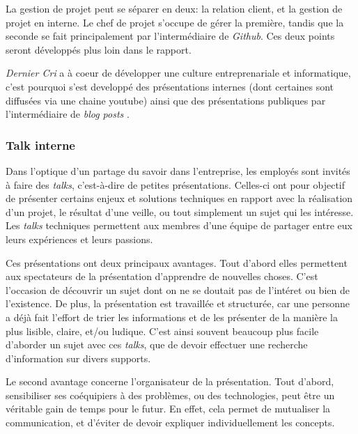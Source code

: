 \documentclass[12pt,a4paper]{article}
\begin{document}
  \bigskip

  La gestion de projet peut se séparer en deux: la relation client, et la
  gestion de projet en interne. Le chef de projet s'occupe de gérer la
  première, tandis que la seconde se fait principalement par
  l'intermédiaire de \emph{Github}. Ces deux points seront développés plus
  loin dans le rapport.

  \bigskip

  \emph{Dernier Cri} a à coeur de développer une culture entreprenariale
  et informatique, c'est pourquoi s'est developpé des présentations
  internes (dont certaines sont diffusées via une chaine youtube) ainsi
  que des présentations publiques par l'intermédiaire de \emph{blog posts}
  .

  \subsubsection{Talk interne}\label{talk-interne}

  \bigskip

  Dans l'optique d'un partage du savoir dans l'entreprise, les employés
  sont invités à faire des \emph{talks}, c'est-à-dire de petites
  présentations. Celles-ci ont pour objectif de présenter certains enjeux
  et solutions techniques en rapport avec la réalisation d'un projet, le
  résultat d'une veille, ou tout simplement un sujet qui les intéresse.
  Les \emph{talks} techniques permettent aux membres d'une équipe de
  partager entre eux leurs expériences et leurs passions.

  \bigskip

  Ces présentations ont deux principaux avantages. Tout d'abord elles
  permettent aux spectateurs de la présentation d'apprendre de nouvelles
  choses. C'est l'occasion de découvrir un sujet dont on ne se doutait pas
  de l'intéret ou bien de l'existence. De plus, la présentation est
  travaillée et structurée, car une personne a déjà fait l'effort de trier
  les informations et de les présenter de la manière la plus lisible,
  claire, et/ou ludique. C'est ainsi souvent beaucoup plus facile
  d'aborder un sujet avec ces \emph{talks}, que de devoir effectuer une
  recherche d'information sur divers supports.

  \bigskip

  Le second avantage concerne l'organisateur de la présentation. Tout
  d'abord, sensibiliser ses coéquipiers à des problèmes, ou des
  technologies, peut être un véritable gain de temps pour le futur. En
  effet, cela permet de mutualiser la communication, et d'éviter de devoir
  expliquer individuellement les concepts.
\end{document}
